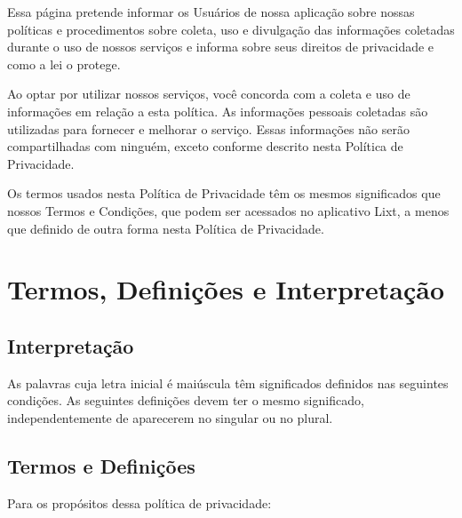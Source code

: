 Essa página pretende informar os Usuários de nossa aplicação sobre nossas políticas e procedimentos sobre coleta, uso e divulgação das informações coletadas durante o uso de nossos serviços e informa sobre seus direitos de privacidade e como a lei o protege.

Ao optar por utilizar nossos serviços, você concorda com a coleta e uso de informações em relação a esta política. As informações pessoais coletadas são utilizadas para fornecer e melhorar o serviço. Essas informações não serão compartilhadas com ninguém, exceto conforme descrito nesta Política de Privacidade.

Os termos usados nesta Política de Privacidade têm os mesmos significados que nossos Termos e Condições, que podem ser acessados no aplicativo Lixt, a menos que definido de outra forma nesta Política de Privacidade.

\section{Termos, Definições e Interpretação}
\subsection{Interpretação}

As palavras cuja letra inicial é maiúscula têm significados definidos nas seguintes condições. As seguintes definições devem ter o mesmo significado, independentemente de aparecerem no singular ou no plural.

\subsection{Termos e Definições}

Para os propósitos dessa política de privacidade:

